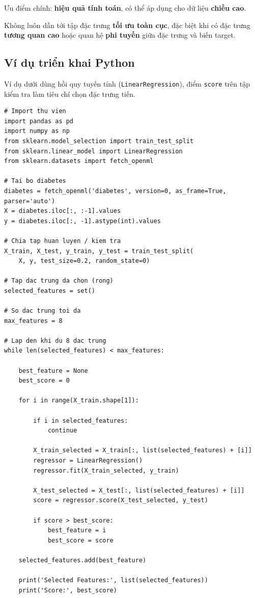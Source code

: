 \begin{tinhchat}[title={Ưu điểm}]
Ưu điểm chính: \textbf{hiệu quả tính toán}, có thể áp dụng cho dữ liệu \textbf{chiều cao}.
\end{tinhchat}

\begin{luuy}[title={Hạn chế}]
Không luôn dẫn tới tập đặc trưng \textbf{tối ưu toàn cục}, đặc biệt khi có đặc trưng \textbf{tương quan cao} hoặc quan hệ \textbf{phi tuyến} giữa đặc trưng và biến target.
\end{luuy}

\subsection{Ví dụ triển khai Python}

\begin{dongco}[title={Bối cảnh}]
Ví dụ dưới dùng hồi quy tuyến tính (\texttt{LinearRegression}), điểm \texttt{score} trên tập kiểm tra làm tiêu chí chọn đặc trưng tiến.
\end{dongco}

\begin{vidu}[title={Code Python đầy đủ}]
\begin{lstlisting}
# Import thu vien
import pandas as pd
import numpy as np
from sklearn.model_selection import train_test_split
from sklearn.linear_model import LinearRegression
from sklearn.datasets import fetch_openml

# Tai bo diabetes
diabetes = fetch_openml('diabetes', version=0, as_frame=True, parser='auto')
X = diabetes.iloc[:, :-1].values
y = diabetes.iloc[:, -1].astype(int).values

# Chia tap huan luyen / kiem tra
X_train, X_test, y_train, y_test = train_test_split(
    X, y, test_size=0.2, random_state=0)

# Tap dac trung da chon (rong)
selected_features = set()

# So dac trung toi da
max_features = 8

# Lap den khi du 8 dac trung
while len(selected_features) < max_features:

    best_feature = None
    best_score = 0

    for i in range(X_train.shape[1]):

        if i in selected_features:
            continue

        X_train_selected = X_train[:, list(selected_features) + [i]]
        regressor = LinearRegression()
        regressor.fit(X_train_selected, y_train)

        X_test_selected = X_test[:, list(selected_features) + [i]]
        score = regressor.score(X_test_selected, y_test)

        if score > best_score:
            best_feature = i
            best_score = score

    selected_features.add(best_feature)

    print('Selected Features:', list(selected_features))
    print('Score:', best_score)
\end{lstlisting}
\end{vidu}

